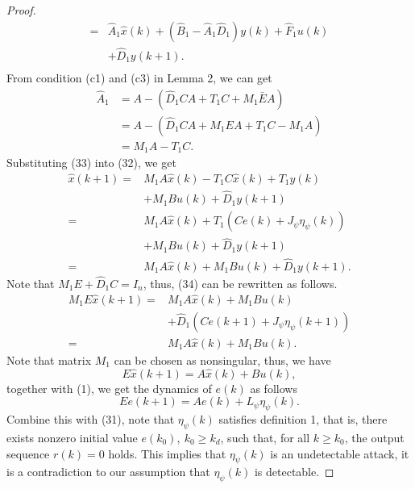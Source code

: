 \documentclass[english]{cccconf}
\theoremstyle{definition}
\begin{document}
\begin{proof}
\begin{equation}
\begin{split}
=&\hat{A}_1\hat{x}(k)+(\hat{B}_1-\hat{A}_1\hat{D}_1)y(k)+\hat{F}_1u(k)\\&+\hat{D}_1y(k+1).\\
\end{split}\end{equation}
From condition (c1) and (c3) in Lemma 2, we can get
\begin{equation}\begin{split}
\hat{A}_1&=A-(\hat{D}_1CA+T_1C+M_1\bar{E}A)\\
&=A-(\hat{D}_1CA+M_1EA+T_1C-M_1A)\\
&=M_1A-T_1C.
 \end{split}\end{equation}
Substituting (33) into (32), we get
\begin{equation}\begin{split}
\hat{x}(k+1)=&M_1A\hat{x}(k)-T_1C\hat{x}(k)+T_1y(k)\\
&+M_1Bu(k)+\hat{D}_1y(k+1)\\
=&M_1A\hat{x}(k)+T_1(Ce(k)+J_{\psi}\eta_\psi(k))\\&+M_1Bu(k)+\hat{D}_1y(k+1)\\
=&M_1A\hat{x}(k)+M_1Bu(k)+\hat{D}_1y(k+1).
\end{split}\end{equation}
Note that $M_1E+\hat{D}_1C=I_n$, thus, (34) can be rewritten as follows.
\begin{align}
M_1E\hat{x}(k+1)=&M_1A\hat{x}(k)+M_1Bu(k)\nonumber\\&+\hat{D}_1(Ce(k+1)+J_{\psi}\eta_\psi(k+1))\\
=&M_1A\hat{x}(k)+M_1Bu(k).\nonumber
\end{align}
Note that matrix $M_1$ can be chosen as nonsingular, thus, we have
\begin{equation}
E\hat{x}(k+1)=A\hat{x}(k)+Bu(k),
\end{equation}
together with (1), we get the dynamics of $e(k)$  as follows
\begin{equation}
Ee(k+1)=Ae(k)+L_{\psi}\eta_\psi(k).
\end{equation}
Combine this with (31), note that $\eta_\psi(k)$ satisfies definition 1, that is, there exists nonzero initial value $e(k_0),\  k_0\geq k_d$, such that, for all $k\geq k_0$, the output sequence $r(k)=0$ holds. This implies that $\eta_\psi(k)$ is an undetectable attack, it is a contradiction to our assumption that $\eta_\psi(k)$ is detectable. 


\end{proof}
\end{document}
